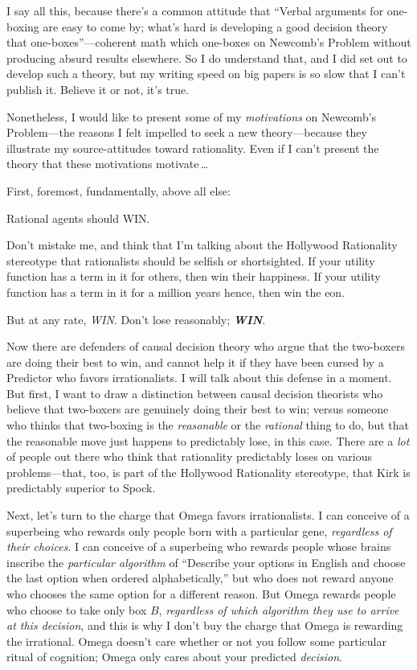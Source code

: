  I say all this, because there's a common attitude
that ``Verbal arguments for one-boxing are easy to
come by; what's hard is developing a good decision
theory that one-boxes''---coherent math which
one-boxes on Newcomb's Problem without producing absurd
results elsewhere. So I do understand that, and I did set out to
develop such a theory, but my writing speed on big papers is so slow
that I can't publish it. Believe it or not,
it's true.


 Nonetheless, I would like to present some of my
\textit{motivations} on Newcomb's Problem---the reasons
I felt impelled to seek a new theory---because they illustrate my
source-attitudes toward rationality. Even if I can't
present the theory that these motivations motivate\,\ldots


 First, foremost, fundamentally, above all else:


 Rational agents should WIN.


 Don't mistake me, and think that
I'm talking about the Hollywood Rationality stereotype
that rationalists should be selfish or shortsighted. If your utility
function has a term in it for others, then win their happiness. If your
utility function has a term in it for a million years hence, then win
the eon.


 But at any rate, \textit{WIN}. Don't lose
reasonably; \textbf{\textit{WIN}}.


 Now there are defenders of causal decision theory who argue that
the two-boxers are doing their best to win, and cannot help it if they
have been cursed by a Predictor who favors irrationalists. I will talk
about this defense in a moment. But first, I want to draw a distinction
between causal decision theorists who believe that two-boxers are
genuinely doing their best to win; versus someone who thinks that
two-boxing is the \textit{reasonable} or the \textit{rational} thing to
do, but that the reasonable move just happens to predictably lose, in
this case. There are a \textit{lot} of people out there who think that
rationality predictably loses on various problems---that, too, is part
of the Hollywood Rationality stereotype, that Kirk is predictably
superior to Spock.


 Next, let's turn to the charge that Omega favors
irrationalists. I can conceive of a superbeing who rewards only people
born with a particular gene, \textit{regardless of their choices}. I
can conceive of a superbeing who rewards people whose brains inscribe
the \textit{particular algorithm} of ``Describe your
options in English and choose the last option when ordered
alphabetically,'' but who does not reward anyone who
chooses the same option for a different reason. But Omega rewards
people who choose to take only box $B$, \textit{regardless of which
algorithm they use to arrive at this decision}, and this is why I
don't buy the charge that Omega is rewarding the
irrational. Omega doesn't care whether or not you
follow some particular ritual of cognition; Omega only cares about your
predicted \textit{decision}.


